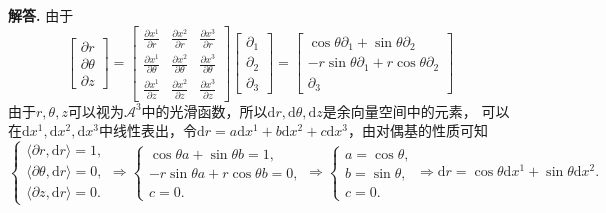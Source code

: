 \documentclass[12pt, a4paper, oneside]{ctexart}
\newenvironment{solution}[1][]{\par\noindent\textbf{#1解答. }}{\smallskip\par}  %
\def\tsty{\textstyle}       %
\def\d{\mathrm{d}}          %
\def\sA{\mathscr{A}}        %
\begin{document}
\begin{solution}
    由于
    \begin{equation*}
        \begin{bmatrix}
            \partial r\\
            \partial \theta\\
            \partial z
        \end{bmatrix} = \begin{bmatrix}
            \tsty\frac{\partial x^1}{\partial r}&\tsty\frac{\partial x^2}{\partial r}&\tsty\frac{\partial x^3}{\partial r}\\
            \tsty\frac{\partial x^1}{\partial \theta}&\tsty\frac{\partial x^2}{\partial \theta}&\tsty\frac{\partial x^3}{\partial \theta}\\
            \tsty\frac{\partial x^1}{\partial z}&\tsty\frac{\partial x^2}{\partial z}&\tsty\frac{\partial x^3}{\partial z}
        \end{bmatrix}\begin{bmatrix}
            \partial_1\\
            \partial_2\\
            \partial_3
        \end{bmatrix} = \begin{bmatrix}
            \cos\theta\partial_1+\sin\theta\partial_2\\
            -r\sin\theta\partial_1+r\cos\theta\partial_2\\
            \partial_3
        \end{bmatrix}
    \end{equation*}
    由于$r,\theta,z$可以视为$\sA^3$中的光滑函数，所以$\d r,\d \theta,\d z$是余向量空间中的元素，
    可以在$\d x^1,\d x^2,\d x^3$中线性表出，令$\d r = a\d x^1+b\d x^2 + c\d x^3$，由对偶基的性质可知
    \begin{equation*}
        \begin{cases}
            \langle\partial r,\d r\rangle = 1,\\
            \langle\partial \theta,\d r\rangle = 0,\\
            \langle\partial z,\d r\rangle = 0.
        \end{cases}\Rightarrow\begin{cases}
            \cos\theta a + \sin\theta b = 1,\\
            -r\sin\theta a + r\cos\theta b = 0,\\
            c = 0.
        \end{cases}\Rightarrow\begin{cases}
            a = \cos\theta,\\
            b = \sin\theta,\\
            c = 0.
        \end{cases}\Rightarrow \d r = \cos\theta\d x^1 + \sin\theta\d x^2.
    \end{equation*}


\end{solution}
\end{document}
